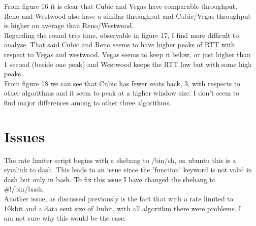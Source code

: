 \documentclass{report}
\begin{document}
From figure 16 it is clear that Cubic and Vegas have comparable throughput, Reno and Westwood also have a similar throughput and Cubic/Vegas throughput is higher on average than Reno/Westwood.\\
Regarding the round trip time, observable in figure 17, I find more difficult to analyse. That said Cubic and Reno seems to have higher peaks of RTT with respect to Vegas and westwood. Vegas seems to keep it below, or just higher than 1 second (beside one peak) and Westwood keeps the RTT low but with some high peaks.\\
From figure 18 we can see that Cubic has fewer seats back, 3, with respects to other algorithms and it seem to peak at a higher window size. I don't seem to find major differences among to other three algorithms.


\section*{Issues}
The rate limiter script begins with a shebang to /bin/sh, on ubuntu this is a symlink to dash. This leads to an issue since the 'function' keyword is not valid in dash but only in bash. To fix this issue I have changed the shebang to \#!/bin/bash.\\
Another issue, as discussed previously is the fact that with a rate limited to 10kbit and a data sent size of 1mbit, with all algorithm there were problems. I am not sure why this would be the case.
\end{document}
